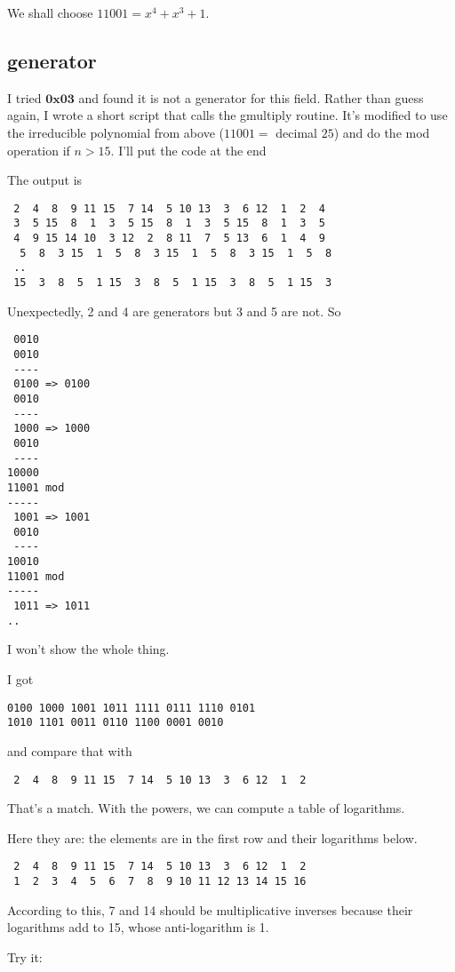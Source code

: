 \documentclass[11pt, oneside]{article}
\begin{document}
We shall choose $11001 = x^4 + x^3 + 1$.

\subsection*{generator}
I tried $\textbf{0x03}$ and found it is not a generator for this field.  Rather than guess again, I wrote a short script that calls the gmultiply routine.  It's modified to use the irreducible polynomial from above ($11001 =$ decimal $25$) and do the mod operation if $n > 15$.  I'll put the code at the end

The output is

\begin{verbatim}
 2  4  8  9 11 15  7 14  5 10 13  3  6 12  1  2  4
 3  5 15  8  1  3  5 15  8  1  3  5 15  8  1  3  5
 4  9 15 14 10  3 12  2  8 11  7  5 13  6  1  4  9
  5  8  3 15  1  5  8  3 15  1  5  8  3 15  1  5  8
 ..
 15  3  8  5  1 15  3  8  5  1 15  3  8  5  1 15  3
\end{verbatim}

Unexpectedly, 2 and 4 are generators but 3 and 5 are not.  So

\begin{verbatim}
 0010
 0010
 ----
 0100 => 0100
 0010
 ----
 1000 => 1000
 0010
 ----
10000
11001 mod
-----
 1001 => 1001
 0010
 ----
10010
11001 mod
-----
 1011 => 1011
..
\end{verbatim}
I won't show the whole thing.

I got
\begin{verbatim} 
0100 1000 1001 1011 1111 0111 1110 0101
1010 1101 0011 0110 1100 0001 0010
\end{verbatim}
and compare that with
\begin{verbatim}
 2  4  8  9 11 15  7 14  5 10 13  3  6 12  1  2
\end{verbatim}

That's a match.  With the powers, we can compute a table of logarithms.  

Here they are:  the elements are in the first row and their logarithms below.
\begin{verbatim}
 2  4  8  9 11 15  7 14  5 10 13  3  6 12  1  2
 1  2  3  4  5  6  7  8  9 10 11 12 13 14 15 16
\end{verbatim}

According to this, 7 and 14 should be multiplicative inverses because their logarithms add to 15, whose anti-logarithm is 1.

Try it:
\end{document}
